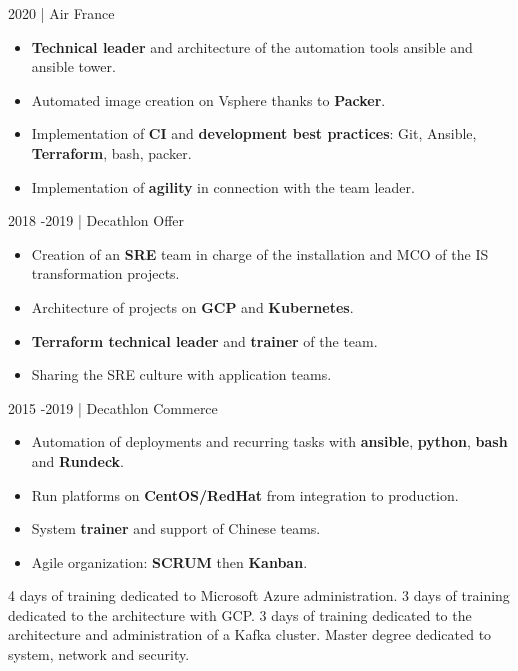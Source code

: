 \documentclass[
	a4paper,
	maincolor=cvartifakt,
	sidecolor=cvgray,
	sidebartextcolor=cvwhite,
	sectioncolor=cvartifakt,
	subsectioncolor=cvgray,
	sidebarwidth=0.36\paperwidth,
    topbottommargin=0.04\paperheight,
]{fortysecondscv}
\begin{document}
\begin{cvtable}[2]
{        \vspace{8pt}
	    \textcolor{maincolor}{2020 | Air France}
	    \begin{itemize}
            \item \textbf{Technical leader} and architecture of the automation tools ansible and ansible tower.
            \item Automated image creation on Vsphere thanks to \textbf{Packer}.
            \item Implementation of \textbf{CI} and \textbf{development best practices}: Git, Ansible, \textbf{Terraform}, bash, packer.
            \item Implementation of \textbf{agility} in connection with the team leader.
        \end{itemize}
		}
	    {
	    \textcolor{maincolor}{2018 -2019 | Decathlon Offer}
	    \begin{itemize}
            \item Creation of an \textbf{SRE} team in charge of the installation and MCO of the IS transformation projects.
            \item Architecture of projects on \textbf{GCP} and \textbf{Kubernetes}.
            \item \textbf{Terraform technical leader} and \textbf{trainer} of the team.
            \item Sharing the SRE culture with application teams.
        \end{itemize}
        \vspace{8pt}
        \textcolor{maincolor}{2015 -2019 | Decathlon Commerce}
	    \begin{itemize}
            \item Automation of deployments and recurring tasks with \textbf{ansible}, \textbf{python}, \textbf{bash} and \textbf{Rundeck}.
            \item Run platforms on \textbf{CentOS/RedHat} from integration to production.
            \item System \textbf{trainer} and support of Chinese teams.
            \item Agile organization: \textbf{SCRUM} then \textbf{Kanban}.
        \end{itemize}
		}
\end{cvtable}

\begin{cvtable}[2]
		{4 days of training dedicated to Microsoft Azure administration.}
		{3 days of training dedicated to the architecture with GCP.}
		{3 days of training dedicated to the architecture and administration of a Kafka cluster.}
		{Master degree dedicated to system, network and security.}
\end{cvtable}

\vspace{-11pt}
\end{document}
